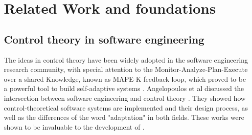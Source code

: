 
\section{Related Work and foundations}


\subsection{Control theory in software engineering}

The ideas in control theory have been widely adopted in the software engineering research community, with special attention to the Monitor-Analyze-Plan-Execute over a shared Knowledge, known as MAPE-K feedback loop, which proved to be a powerful tool to build self-adaptive systems \cite{arcaini_modeling_2015, salehie_self-adaptive_2009, Brun2013, computing_architectural_2006, kephart_vision_2003, de_lemos_software_2013}. Angelopoulos et al discussed the intersection between software engineering and control theory \cite{filieri2015software}. They showed how control-theoretical software systems are implemented and their design process, as well as the differences of the word "adaptation" in both fields. These works were shown to be invaluable to the development of \projectname{}.

